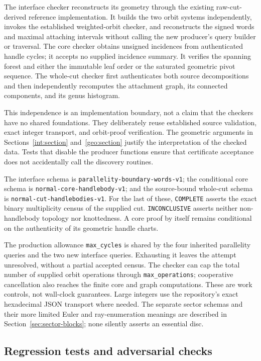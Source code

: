 The interface checker reconstructs its geometry through the existing
raw-cut-derived reference implementation.  It builds the two orbit systems
independently, invokes the established weighted-orbit checker, and reconstructs
the signed words and maximal attaching intervals without calling the new
producer's query builder or traversal.  The core checker obtains unsigned
incidences from authenticated handle cycles; it accepts no supplied incidence
summary.  It verifies the spanning forest and either the immutable leaf order
or the saturated geometric pivot sequence.  The whole-cut checker first
authenticates both source decompositions and then independently recomputes the
attachment graph, its connected components, and its genus histogram.

This independence is an implementation boundary, not a claim that the checkers
have no shared foundations.  They deliberately reuse established source
validation, exact integer transport, and orbit-proof verification.  The
geometric arguments in Sections~\ref{int:section} and~\ref{geo:section} justify
the interpretation of the checked data.  Tests that disable the producer
functions ensure that certificate acceptance does not accidentally call the
discovery routines.

The interface schema is \texttt{parallelity-boundary-words-v1}; the conditional
core schema is \texttt{normal-core-handlebody-v1}; and the source-bound whole-cut
schema is \texttt{normal-cut-handlebodies-v1}.  For the last of these,
\texttt{COMPLETE} asserts the exact binary multiplicity census of the supplied
cut.  \texttt{INCONCLUSIVE} asserts neither non-handlebody topology nor
knottedness.  A core proof by itself remains conditional on the authenticity
of its geometric handle charts.

The production allowance \texttt{max\_cycles} is shared by the four inherited
parallelity queries and the two new interface queries.  Exhausting it leaves
the attempt unresolved, without a partial accepted census.  The checker can
cap the total number of supplied orbit operations through
\texttt{max\_operations}; cooperative cancellation also reaches the finite
core and graph computations.  These are work controls, not wall-clock
guarantees.  Large integers use the repository's exact hexadecimal JSON
transport where needed.  The separate sector schemas and their more limited
Euler and ray-enumeration meanings are described in
Section~\ref{sec:sector-blocks}; none silently asserts an essential disc.

\subsection{Regression tests and adversarial checks}
\label{main:exp-tests}

